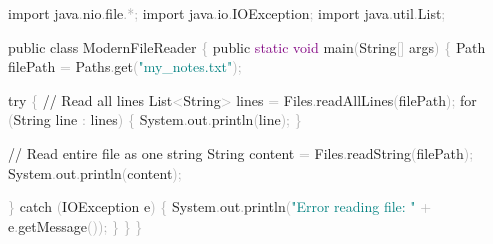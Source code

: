 \documentclass[
  justified,
  openright,
]{tufte-book}
\newcommand{\BuiltInTok}[1]{#1}
\newcommand{\CommentTok}[1]{\textcolor{MidGray}{#1}}
\newcommand{\ControlFlowTok}[1]{\textcolor{BrandBlue}{#1}}
\newcommand{\DataTypeTok}[1]{\textcolor{Purple}{#1}}
\newcommand{\FunctionTok}[1]{\textcolor{BrandBlue}{#1}}
\newcommand{\ImportTok}[1]{\textcolor{BrandAccent}{#1}}
\newcommand{\KeywordTok}[1]{\textcolor{BrandBlue}{#1}}
\newcommand{\NormalTok}[1]{#1}
\newcommand{\OperatorTok}[1]{\textcolor{DarkGray}{#1}}
\newcommand{\StringTok}[1]{\textcolor{Teal}{#1}}
\newenvironment{Shaded}{%
  \begin{snugshade}
}{%
  \end{snugshade}
}
\begin{document}
\begin{Shaded}
\begin{Highlighting}[]
\KeywordTok{import} \ImportTok{java}\OperatorTok{.}\ImportTok{nio}\OperatorTok{.}\ImportTok{file}\OperatorTok{.*;}
\KeywordTok{import} \ImportTok{java}\OperatorTok{.}\ImportTok{io}\OperatorTok{.}\ImportTok{IOException}\OperatorTok{;}
\KeywordTok{import} \ImportTok{java}\OperatorTok{.}\ImportTok{util}\OperatorTok{.}\ImportTok{List}\OperatorTok{;}

\KeywordTok{public} \KeywordTok{class}\NormalTok{ ModernFileReader }\OperatorTok{\{}
    \KeywordTok{public} \DataTypeTok{static} \DataTypeTok{void} \FunctionTok{main}\OperatorTok{(}\BuiltInTok{String}\OperatorTok{[]}\NormalTok{ args}\OperatorTok{)} \OperatorTok{\{}
\NormalTok{        Path filePath }\OperatorTok{=}\NormalTok{ Paths}\OperatorTok{.}\FunctionTok{get}\OperatorTok{(}\StringTok{"my\_notes.txt"}\OperatorTok{);}

        \ControlFlowTok{try} \OperatorTok{\{}
            \CommentTok{// Read all lines}
            \BuiltInTok{List}\OperatorTok{\textless{}}\BuiltInTok{String}\OperatorTok{\textgreater{}}\NormalTok{ lines }\OperatorTok{=}\NormalTok{ Files}\OperatorTok{.}\FunctionTok{readAllLines}\OperatorTok{(}\NormalTok{filePath}\OperatorTok{);}
            \ControlFlowTok{for} \OperatorTok{(}\BuiltInTok{String}\NormalTok{ line }\OperatorTok{:}\NormalTok{ lines}\OperatorTok{)} \OperatorTok{\{}
                \BuiltInTok{System}\OperatorTok{.}\FunctionTok{out}\OperatorTok{.}\FunctionTok{println}\OperatorTok{(}\NormalTok{line}\OperatorTok{);}
            \OperatorTok{\}}

            \CommentTok{// Read entire file as one string}
            \BuiltInTok{String}\NormalTok{ content }\OperatorTok{=}\NormalTok{ Files}\OperatorTok{.}\FunctionTok{readString}\OperatorTok{(}\NormalTok{filePath}\OperatorTok{);}
            \BuiltInTok{System}\OperatorTok{.}\FunctionTok{out}\OperatorTok{.}\FunctionTok{println}\OperatorTok{(}\NormalTok{content}\OperatorTok{);}

        \OperatorTok{\}} \ControlFlowTok{catch} \OperatorTok{(}\BuiltInTok{IOException}\NormalTok{ e}\OperatorTok{)} \OperatorTok{\{}
            \BuiltInTok{System}\OperatorTok{.}\FunctionTok{out}\OperatorTok{.}\FunctionTok{println}\OperatorTok{(}\StringTok{"Error reading file: "} \OperatorTok{+}\NormalTok{ e}\OperatorTok{.}\FunctionTok{getMessage}\OperatorTok{());}
        \OperatorTok{\}}
    \OperatorTok{\}}
\OperatorTok{\}}
\end{Highlighting}
\end{Shaded}
\end{document}
